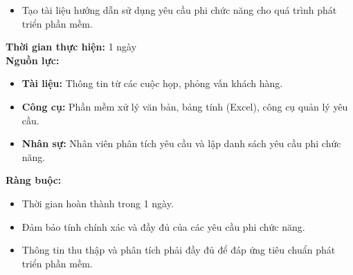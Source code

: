 {\begin{minipage}{\textwidth}
\begin{itemize}
        \item Tạo tài liệu hướng dẫn sử dụng yêu cầu phi chức năng cho quá trình phát triển phần mềm.
    \end{itemize}
    \vspace{0.5cm}
    \noindent \textbf{Thời gian thực hiện:} 1 ngày \\
    \noindent \textbf{Nguồn lực:}
    \begin{itemize}
        \item \textbf{Tài liệu:} Thông tin từ các cuộc họp, phỏng vấn khách hàng.
        \item \textbf{Công cụ:} Phần mềm xử lý văn bản, bảng tính (Excel), công cụ quản lý yêu cầu.
        \item \textbf{Nhân sự:} Nhân viên phân tích yêu cầu và lập danh sách yêu cầu phi chức năng.
    \end{itemize}
    \vspace{0.5cm}
    \noindent \textbf{Ràng buộc:}
    \begin{itemize}
        \item Thời gian hoàn thành trong 1 ngày.
        \item Đảm bảo tính chính xác và đầy đủ của các yêu cầu phi chức năng.
        \item Thông tin thu thập và phân tích phải đầy đủ để đáp ứng tiêu chuẩn phát triển phần mềm.
    \end{itemize}
    \end{minipage}
}
\newpage %
% 
